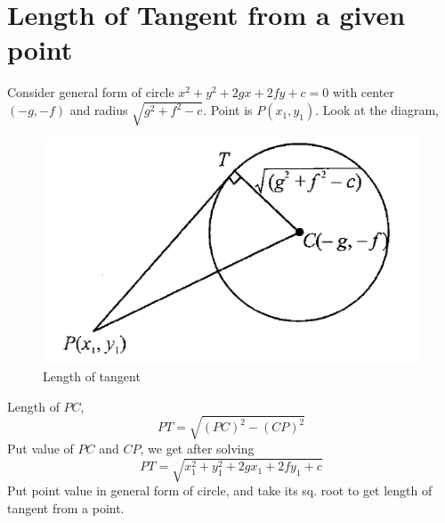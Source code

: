 \documentclass{article}
\begin{document}
\section{Length of Tangent from a given point}
Consider general form of circle $x^2+y^2+2gx+2fy+c=0$ with center $(-g,-f)$ and radius $\sqrt{g^2+f^2-c}$. Point is $P(x_1,y_1)$. Look at the diagram,
\begin{figure}[H]
    \centering
    \includegraphics[scale=0.5]{length_of_tangent.png}
    \caption{Length of tangent}
\end{figure}
Length of $PC$,
\begin{equation*}
    PT=\sqrt{(PC)^2-(CP)^2}
\end{equation*}
Put value of $PC$ and $CP$, we get after solving
\begin{equation*}
    PT=\sqrt{x_1^2+y_1^2+2gx_1+2fy_1+c}
\end{equation*}
Put point value in general form of circle, and take its sq. root to get length of tangent from a point. 
\end{document}
